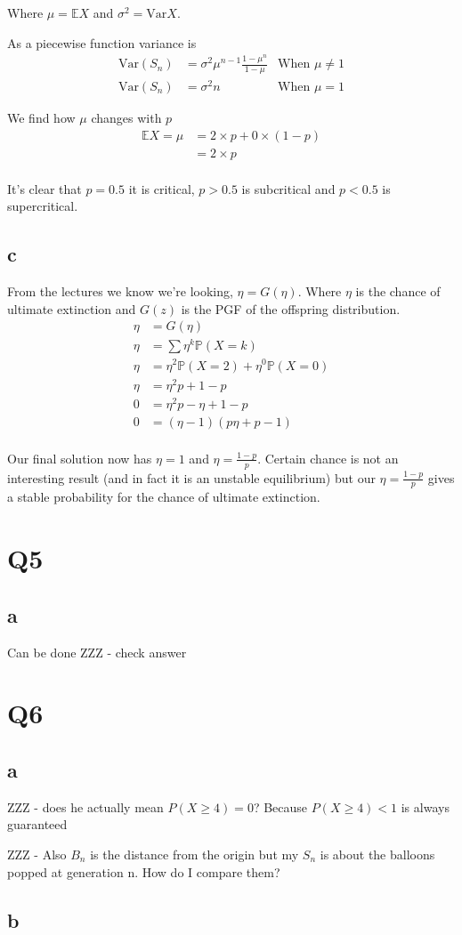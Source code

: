 \documentclass{article}
\newcommand{\prob}{\mathbb{P}}
\newcommand{\expect}{\mathbb{E}}
\newcommand{\var}{\text{Var}}
\begin{document}
Where $\mu = \expect X$ and $\sigma^2 = \var X$.

As a piecewise function variance is
\begin{align*}
    \var(S_n) &= \sigma^2 \mu^{n-1} \frac{1-\mu^n}{1-\mu}
    & \text{When $\mu \neq 1$} \\
    \var(S_n) &= \sigma^2 n
    & \text{When $\mu = 1$}
\end{align*}

We find how $\mu$ changes with $p$
\begin{align*}
    \expect X = \mu &= 2 \times p + 0 \times (1 - p) \\
    &= 2 \times p \\
\end{align*}

It's clear that $p = 0.5$ it is critical, $p > 0.5$ is subcritical and
$p < 0.5$ is supercritical.

\subsection{c}
From the lectures we know we're looking, $\eta = G(\eta)$. Where $\eta$ is
the chance of ultimate extinction and $G(z)$ is the PGF of the offspring
distribution.
\begin{align*}
    \eta &= G(\eta) \\
    \eta &= \sum \eta^k \prob(X=k) \\
    \eta &= \eta^2 \prob(X=2) + \eta^0 \prob(X=0) \\
    \eta &= \eta^2 p + 1 - p \\
    0 &= \eta^2 p - \eta + 1 - p \\
    0 &= (\eta - 1)(p \eta + p - 1)  \\
\end{align*}

Our final solution now has $\eta = 1$ and $\eta = \frac{1-p}{p}$.
Certain chance is not an interesting result (and in fact it is an unstable
equilibrium) but our $\eta = \frac{1-p}{p}$ gives a stable probability
for the chance of ultimate extinction.

\section{Q5}
\subsection{a}
Can be done
ZZZ - check answer

\section{Q6}
\subsection{a}
ZZZ - does he actually mean $P(X \geq 4) = 0$? Because $P(X \geq 4) < 1$ is always
guaranteed

ZZZ - Also $B_n$ is the distance from the origin but my $S_n$ is about the balloons
popped at generation n. How do I compare them?

\subsection{b}
\end{document}
